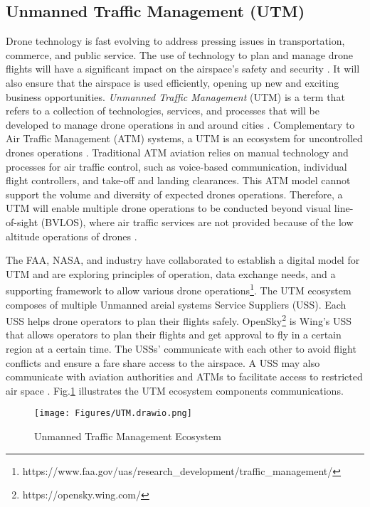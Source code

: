\documentclass[conference]{IEEEtran}
\begin{document}
\subsection{Unmanned Traffic Management (UTM)}

Drone technology is fast evolving to address pressing issues in transportation, commerce, and public service. The use of technology to plan and manage drone flights will have a significant impact on the airspace's safety and security \cite{kopardekar2016unmanned}. It will also ensure that the airspace is used efficiently, opening up new and exciting business opportunities. \textit{Unmanned Traffic Management} (UTM) is a term that refers to a collection of technologies, services, and processes that will be developed to manage drone operations in and around cities \cite{kopardekar2014unmanned}. Complementary to Air Traffic Management (ATM) systems, a UTM is an ecosystem for uncontrolled drones operations \cite{sandor2019challenges}. Traditional ATM aviation relies on manual technology and processes for air traffic control, such as voice-based communication, individual flight controllers, and take-off and landing clearances. This ATM model cannot support the volume and diversity of expected drones operations. Therefore, a UTM will enable multiple drone operations to be conducted beyond visual line-of-sight (BVLOS), where air traffic services are not provided because of the low altitude operations of drones \cite{kopardekar2016unmanned}. 


The FAA, NASA, and industry have collaborated to establish a digital model for UTM and are exploring principles of operation, data exchange needs, and a supporting framework to allow various drone operations\footnote{https://www.faa.gov/uas/research\_development/traffic\_management/}. The UTM ecosystem composes of multiple Unmanned areial systems Service Suppliers (USS). Each USS helps drone operators to plan their flights safely. OpenSky\footnote{https://opensky.wing.com/} is Wing's USS that allows operators to plan their flights and get approval to fly in a certain region at a certain time. The USSs' communicate with each other to avoid flight conflicts and ensure a fare share access to the airspace. A USS may also communicate with aviation authorities and ATMs to facilitate access to restricted air space \cite{kopardekar2016unmanned}. Fig.\ref{utm} illustrates the UTM ecosystem components communications.

\begin{figure} [h]
    \centering
    \texttt{[image: Figures/UTM.drawio.png]}
    \caption{Unmanned Traffic Management Ecosystem}
    \label{utm}
\end{figure}
\end{document}
